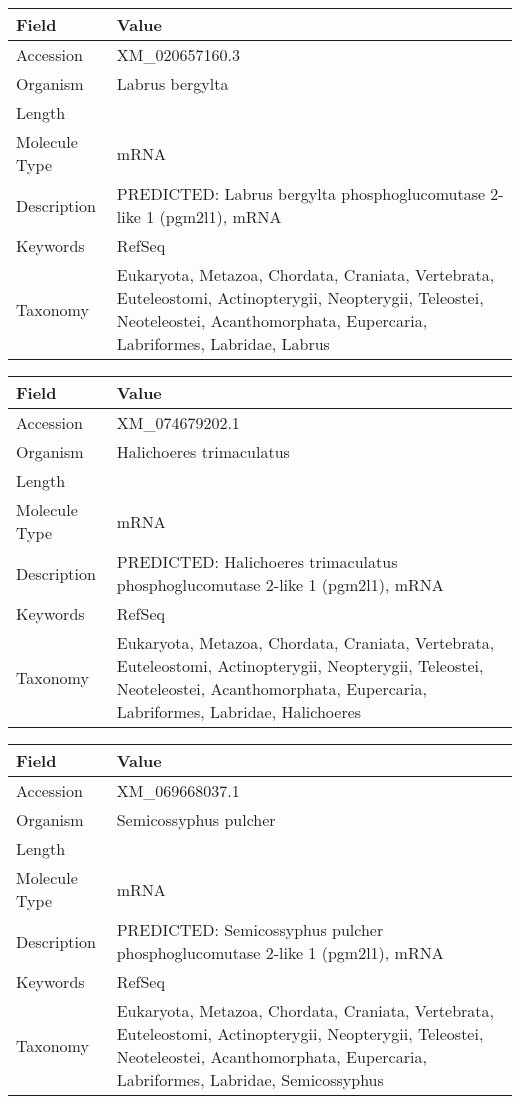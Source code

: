 \documentclass[10pt]{article}
\begin{document}
\vspace{1em}
{\footnotesize
\begin{longtable}{>{\raggedright\arraybackslash}p{4.5cm} >{\raggedright\arraybackslash}p{11.5cm}}
\textbf{Field} & \textbf{Value} \\
\hline
Accession & XM\_020657160.3 \\
Organism & Labrus bergylta \\
Length & 2495 \\
Molecule Type & mRNA \\
Description & PREDICTED: Labrus bergylta phosphoglucomutase 2-like 1 (pgm2l1), mRNA \\
Keywords & RefSeq \\
Taxonomy & Eukaryota, Metazoa, Chordata, Craniata, Vertebrata, Euteleostomi, Actinopterygii, Neopterygii, Teleostei, Neoteleostei, Acanthomorphata, Eupercaria, Labriformes, Labridae, Labrus \\
\end{longtable}
}

\vspace{1em}
{\footnotesize
\begin{longtable}{>{\raggedright\arraybackslash}p{4.5cm} >{\raggedright\arraybackslash}p{11.5cm}}
\textbf{Field} & \textbf{Value} \\
\hline
Accession & XM\_074679202.1 \\
Organism & Halichoeres trimaculatus \\
Length & 3369 \\
Molecule Type & mRNA \\
Description & PREDICTED: Halichoeres trimaculatus phosphoglucomutase 2-like 1 (pgm2l1), mRNA \\
Keywords & RefSeq \\
Taxonomy & Eukaryota, Metazoa, Chordata, Craniata, Vertebrata, Euteleostomi, Actinopterygii, Neopterygii, Teleostei, Neoteleostei, Acanthomorphata, Eupercaria, Labriformes, Labridae, Halichoeres \\
\end{longtable}
}

\vspace{1em}
{\footnotesize
\begin{longtable}{>{\raggedright\arraybackslash}p{4.5cm} >{\raggedright\arraybackslash}p{11.5cm}}
\textbf{Field} & \textbf{Value} \\
\hline
Accession & XM\_069668037.1 \\
Organism & Semicossyphus pulcher \\
Length & 3361 \\
Molecule Type & mRNA \\
Description & PREDICTED: Semicossyphus pulcher phosphoglucomutase 2-like 1 (pgm2l1), mRNA \\
Keywords & RefSeq \\
Taxonomy & Eukaryota, Metazoa, Chordata, Craniata, Vertebrata, Euteleostomi, Actinopterygii, Neopterygii, Teleostei, Neoteleostei, Acanthomorphata, Eupercaria, Labriformes, Labridae, Semicossyphus \\
\end{longtable}
}
\end{document}
